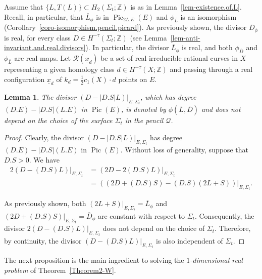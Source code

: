\documentclass[10pt,a4paper]{article}
\numberwithin{equation}{section}
\theoremstyle{definition}
\theoremstyle{plain}
\newtheorem{lemma}[definition]{Lemma}
\theoremstyle{remark}
\newcommand{\Z}{\mathbb{Z}}
\DeclareMathOperator{\Pic}{Pic}
\begin{document}
Assume that $\{L,T(L)\}\subset H_2(\Sigma_t;\Z)$ is as in  Lemma~\ref{lem-existence.of.L}. Recall, in particular, that $\overline{L}_{\phi}$ is  in $\Pic_{2L.E}(E)$ and $\phi_{\overline{L}}$ is an isomorphism (Corollary~\ref{coro-isomorphism.pencil.picard}). As previously shown, the divisor $\overline{D}_{\phi}$ is real, for every class $D \in H^{-\tau}(\Sigma_t;\Z)$ (see Lemma~\ref{lem-anti-invariant.and.real.divisors}). In particular, the divisor $\overline{L}_{\phi}$ is real, and both $\phi_{\overline{D}}$ and $\phi_{\overline{L}}$ are real maps.
Let $\mathcal{R}(\underline{x}_d)$ be a set of real irreducible rational curves in $X$ representing a given homology class $d\in H^{-\tau}(X;\Z)$ and passing through a real configuration $\underline{x}_d$ of $k_d=\frac{1}{2}c_1(X)\cdot d$ points on $E$.


\begin{lemma} \label{lem-constant.divisor.L.D}
The divisor $(D-|D.S|L)|_{E,\Sigma_t}$, which has degree $(D.E)-|D.S|(L.E)$ in $\Pic(E)$, is denoted by $\phi(\overline{L},\overline{D})$ and does not depend on the choice of the surface $\Sigma_t$ in the pencil $\mathcal{Q}$.
\end{lemma}


\begin{proof}
Clearly, the divisor  $(D-|D.S|L)|_{E,\Sigma_t}$ has degree $(D.E)-|D.S|(L.E)$ in $\Pic(E)$. Without loss of generality, suppose that $D.S> 0$. We have
  \begin{align*}
      2\left(D-(D.S)L\right)|_{E,\Sigma_t} &= \left(2D-2(D.S)L\right)|_{E,\Sigma_t}\\
      &= \left((2D+(D.S)S)-(D.S) (2L+S)\right) |_{E,\Sigma_t}.
  \end{align*}
   
As previously shown, both $(2L+S)|_{E,\Sigma_t}=\overline{L}_{\phi}$ and $(2D+(D.S)S)|_{E,\Sigma_t}=\overline{D}_{\phi}$ are constant with respect to $\Sigma_t$. Consequently, the divisor $ 2\left(D-(D.S)L\right)|_{E,\Sigma_t}$ does not depend on the choice of $\Sigma_t$. Therefore, by continuity, the divisor $ \left(D-(D.S)L\right)|_{E,\Sigma_t}$  is also independent of $\Sigma_t$. 
\end{proof}

The next proposition is the main ingredient to solving the \textit{$1$-dimensional real problem} of Theorem~\ref{Theorem2-W}.
\end{document}
